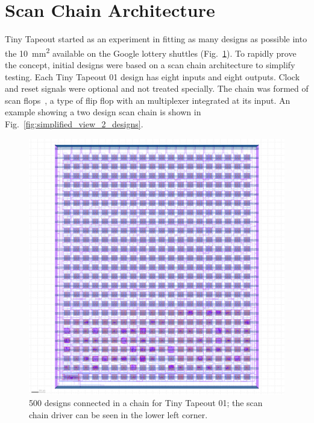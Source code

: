 \section{Scan Chain Architecture}
\label{sec:scanchain_arch}

Tiny Tapeout started as an experiment in fitting as many designs as possible into the \qty{10}{\milli\meter\squared} available on the Google lottery shuttles (Fig.~\ref{fig:500_designs_chain_TT01}).
To rapidly prove the concept, initial designs were based on a scan chain architecture to simplify testing.
Each Tiny Tapeout 01 design has eight inputs and eight outputs.
Clock and reset signals were optional and not treated specially. The chain was formed of scan flops~\cite{skywaterpdk}, a type of flip flop with an multiplexer integrated at its input. An example showing a two design scan chain is shown in Fig.~\ref{fig:simplified_view_2_designs}.

\begin{figure}[!t]
\centering
\includegraphics[width=1\columnwidth]{./Figs/tt01_whole_die.png}
\caption{500 designs connected in a chain for Tiny Tapeout 01; the scan chain driver can be seen in the lower left corner.}
\label{fig:500_designs_chain_TT01}
\end{figure}

